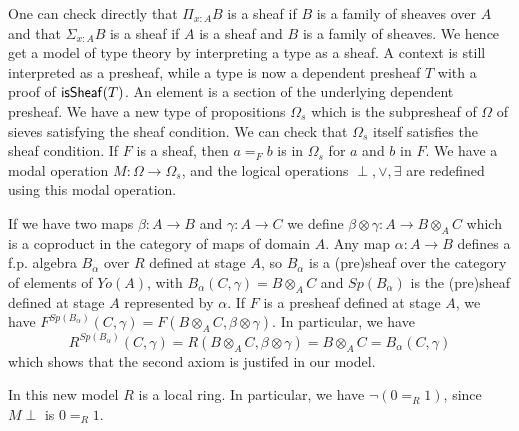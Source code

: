     \medskip

    One can check directly that $\Pi_{x:A}B$ is a sheaf if $B$ is a family of sheaves over $A$
    and that $\Sigma_{x:A}B$ is a sheaf if $A$ is a sheaf and $B$ is a family of sheaves. We hence get a model of type theory
    by interpreting a type as a sheaf. A context is still interpreted as a presheaf, while a type is now a dependent presheaf $T$
    with a proof of $\mathsf{isSheaf}(T)$. An element is a section of the underlying dependent presheaf.
    We have a new type of propositions $\Omega_s$ which is the subpresheaf of $\Omega$ of sieves satisfying the sheaf condition.
    We can check that $\Omega_s$ itself satisfies the sheaf condition. If $F$ is a sheaf, then $a =_F b$ is in $\Omega_s$
    for $a$ and $b$ in $F$. We have a modal operation $M:\Omega\rightarrow \Omega_s$, and the logical operations $\perp,\vee,\exists$
    are redefined using this modal operation.

    \medskip

    If we have two maps $\beta:A\rightarrow B$ and $\gamma:A\rightarrow C$ we define
    $\beta\otimes\gamma:A \rightarrow B\otimes_AC$ which is a coproduct in the category of maps of domain $A$.
    Any map $\alpha:A\rightarrow B$ defines a f.p. algebra $B_{\alpha}$ over $R$ defined at stage $A$, so $B_{\alpha}$ is a (pre)sheaf over
    the category of elements of $Yo(A)$, with
    $B_{\alpha}(C,\gamma) = B\otimes_A C$ and $Sp(B_{\alpha})$ is
    the (pre)sheaf defined at stage $A$ represented by $\alpha$.
    If $F$ is a presheaf defined at stage $A$, we have $F^{Sp(B_{\alpha})}(C,\gamma) = F(B\otimes_A C,\beta\otimes\gamma)$.
    In particular, we have
    $$R^{Sp(B_{\alpha})}(C,\gamma) = R(B\otimes_A C,\beta\otimes\gamma) = B\otimes_A C = B_{\alpha}(C,\gamma)$$
    which shows that the second axiom is justifed in our model.


    In this new model $R$ is a local ring.
    In particular, we have $\neg (0 =_R 1)$, since $M\perp$ is $0 =_R 1$.
    
